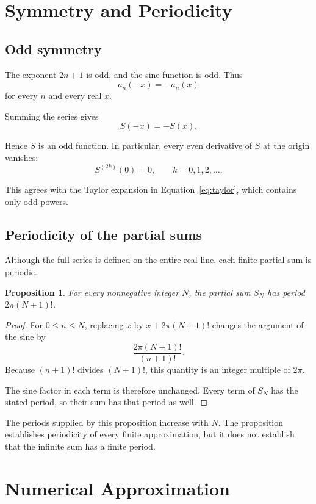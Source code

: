 \documentclass[12pt]{article}
\newtheorem{proposition}[theorem]{Proposition}
\theoremstyle{definition}
\theoremstyle{remark}
\begin{document}
\section{Symmetry and Periodicity}

\subsection{Odd symmetry}

The exponent \(2n+1\) is odd, and the sine function is odd.
Thus
\[
a_n(-x)=-a_n(x)
\]
for every \(n\) and every real \(x\).

Summing the series gives
\[
S(-x)=-S(x).
\]

Hence \(S\) is an odd function. In particular, every even
derivative of \(S\) at the origin vanishes:
\[
S^{(2k)}(0)=0,
\qquad k=0,1,2,\ldots.
\]

This agrees with the Taylor expansion in
Equation~\eqref{eq:taylor}, which contains only odd powers.

\subsection{Periodicity of the partial sums}

Although the full series is defined on the entire real line,
each finite partial sum is periodic.

\begin{proposition}
For every nonnegative integer \(N\), the partial sum \(S_N\)
has period \(2\pi(N+1)!\).
\end{proposition}

\begin{proof}
For \(0\leq n\leq N\), replacing \(x\) by
\(x+2\pi(N+1)!\) changes the argument of the sine by
\[
\frac{2\pi(N+1)!}{(n+1)!}.
\]
Because \((n+1)!\) divides \((N+1)!\), this quantity is
an integer multiple of \(2\pi\).

The sine factor in each term is therefore unchanged.
Every term of \(S_N\) has the stated period, so their sum
has that period as well.
\end{proof}

The periods supplied by this proposition increase with
\(N\). The proposition establishes periodicity of every
finite approximation, but it does not establish that the
infinite sum has a finite period.

\section{Numerical Approximation}
\end{document}
